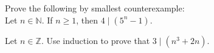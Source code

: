 \documentclass{article}
\newcommand{\Z}{\mathbb{Z}}
\theoremstyle{definition}
\begin{document}
\begin{question}
    Prove the following by smallest counterexample:\\
    Let $n\in \mathbb{N}$. If $n\geq 1$, then $4 \mid (5^n-1)$.
\end{question}
\begin{solution}
\end{solution}


\begin{question}
    Let $n\in \Z$. Use induction to prove that $3 \mid (n^3+2n)$. 
\end{question}
\begin{solution}
\end{solution}
\end{document}
